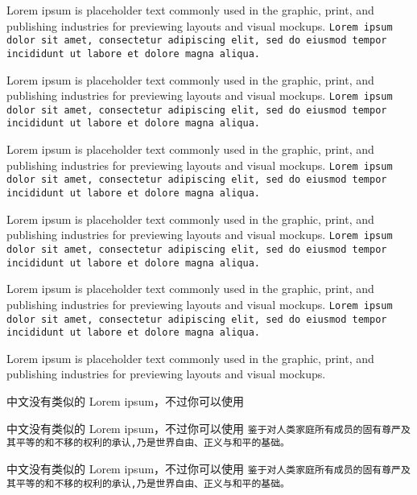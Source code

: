 \documentclass[11pt]{ctexart}
\begin{document}
Lorem ipsum is placeholder text commonly used in the graphic, print, and publishing industries for previewing layouts and visual mockups.
\texttt{Lorem ipsum dolor sit amet, consectetur adipiscing elit, sed do eiusmod tempor incididunt ut labore et dolore magna aliqua.}

Lorem ipsum is placeholder text commonly used in the graphic, print, and publishing industries for previewing layouts and visual mockups.
\texttt{Lorem ipsum dolor sit amet, consectetur adipiscing elit, sed do eiusmod tempor incididunt ut labore et dolore magna aliqua.}

Lorem ipsum is placeholder text commonly used in the graphic, print, and publishing industries for previewing layouts and visual mockups.
\texttt{Lorem ipsum dolor sit amet, consectetur adipiscing elit, sed do eiusmod tempor incididunt ut labore et dolore magna aliqua.}

Lorem ipsum is placeholder text commonly used in the graphic, print, and publishing industries for previewing layouts and visual mockups.
\texttt{Lorem ipsum dolor sit amet, consectetur adipiscing elit, sed do eiusmod tempor incididunt ut labore et dolore magna aliqua.}

Lorem ipsum is placeholder text commonly used in the graphic, print, and publishing industries for previewing layouts and visual mockups.
\texttt{Lorem ipsum dolor sit amet, consectetur adipiscing elit, sed do eiusmod tempor incididunt ut labore et dolore magna aliqua.}

Lorem ipsum is placeholder text commonly used in the graphic, print, and publishing industries for previewing layouts and visual mockups.

中文没有类似的 Lorem ipsum，不过你可以使用 

中文没有类似的 Lorem ipsum，不过你可以使用 \texttt{鉴于对人类家庭所有成员的固有尊严及其平等的和不移的权利的承认,乃是世界自由、正义与和平的基础。}

中文没有类似的 Lorem ipsum，不过你可以使用 \texttt{鉴于对人类家庭所有成员的固有尊严及其平等的和不移的权利的承认,乃是世界自由、正义与和平的基础。}
\end{document}
